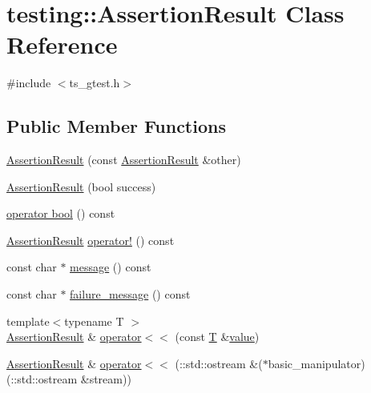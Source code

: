\hypertarget{classtesting_1_1AssertionResult}{\section{testing\-:\-:Assertion\-Result Class Reference}
\label{classtesting_1_1AssertionResult}
}


{\ttfamily \#include $<$ts\-\_\-gtest.\-h$>$}

\subsection*{Public Member Functions}
\begin{DoxyCompactItemize}
\item 
\hyperlink{classtesting_1_1AssertionResult_a27788116f03f90aec4daf592fd809ead}{Assertion\-Result} (const \hyperlink{classtesting_1_1AssertionResult}{Assertion\-Result} \&other)
\item 
\hyperlink{classtesting_1_1AssertionResult_ade695178c05c4b2f82e92930c912fc25}{Assertion\-Result} (bool success)
\item 
\hyperlink{classtesting_1_1AssertionResult_af85b7852e6399467cd74df539810abcd}{operator bool} () const 
\item 
\hyperlink{classtesting_1_1AssertionResult}{Assertion\-Result} \hyperlink{classtesting_1_1AssertionResult_a85301ba52aa1efe89b79d1e3b59160cd}{operator!} () const 
\item 
const char $\ast$ \hyperlink{classtesting_1_1AssertionResult_ab20c91eba13e20f1b4ad89e3d15f69a8}{message} () const 
\item 
const char $\ast$ \hyperlink{classtesting_1_1AssertionResult_ae54fa82506c507a9dbc0f85d2cec652a}{failure\-\_\-message} () const 
\item 
{\footnotesize template$<$typename T $>$ }\\\hyperlink{classtesting_1_1AssertionResult}{Assertion\-Result} \& \hyperlink{classtesting_1_1AssertionResult_a3230efa81aafe7c61f5fb878cfa39e91}{operator$<$$<$} (const \hyperlink{calib3d_8hpp_a3efb9551a871ddd0463079a808916717}{T} \&\hyperlink{highgui__c_8h_ad4670c92695d4327c21292905a803901}{value})
\item 
\hyperlink{classtesting_1_1AssertionResult}{Assertion\-Result} \& \hyperlink{classtesting_1_1AssertionResult_a43ae8a260843ce2ff3dc9af262672b8b}{operator$<$$<$} (\-::std\-::ostream \&($\ast$basic\-\_\-manipulator)(\-::std\-::ostream \&stream))
\end{DoxyCompactItemize}


